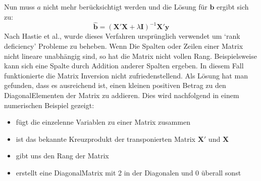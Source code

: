\documentclass[letterpaper,10pt,english]{jupyterBook}
\begin{document}
\sphinxAtStartPar
Nun muss \(a\) nicht mehr berücksichtigt werden und die Lösung für \(\mathbf{b}\) ergibt sich zu:
\begin{equation*}\hat{\mathbf{b}} = (\mathbf{X}'\mathbf{X} + \lambda\mathbf{I})^{-1}\mathbf{X}'\mathbf{y}\end{equation*}
\sphinxAtStartPar
Nach Hastie et al., wurde dieses Verfahren ursprünglich verwendet um ‘rank deficiency’ Probleme zu beheben. Wenn Die Spalten oder Zeilen einer Matrix nicht lineare unabhängig sind, so hat die Matrix nicht vollen Rang. Beispielsweise kann sich eine Spalte durch Addition anderer Spalten ergeben. In diesem Fall funktionierte die Matrix Inversion nicht zufriedenstellend. Als Lösung hat man gefunden, dass es ausreichend ist, einen kleinen positiven Betrag zu den Diagonal\sphinxhyphen{}Elementen der Matrix zu addieren.
Dies wird nachfolgend in einem numerischen Beispiel gezeigt:
\begin{itemize}
\item {} 
\sphinxAtStartPar
{} fügt die einzelenne Variablen zu einer Matrix zusammen

\item {} 
\sphinxAtStartPar
{} ist das bekannte Kreuzprodukt der transponierten Matrix \(\mathbf{X'}\) und \(\mathbf{X}\)

\item {} 
\sphinxAtStartPar
{} gibt uns den Rang der Matrix

\item {} 
\sphinxAtStartPar
{} erstellt eine Diagonal\sphinxhyphen{}Matrix mit 2 in der Diagonalen und 0 überall sonst

\end{itemize}
\end{document}
